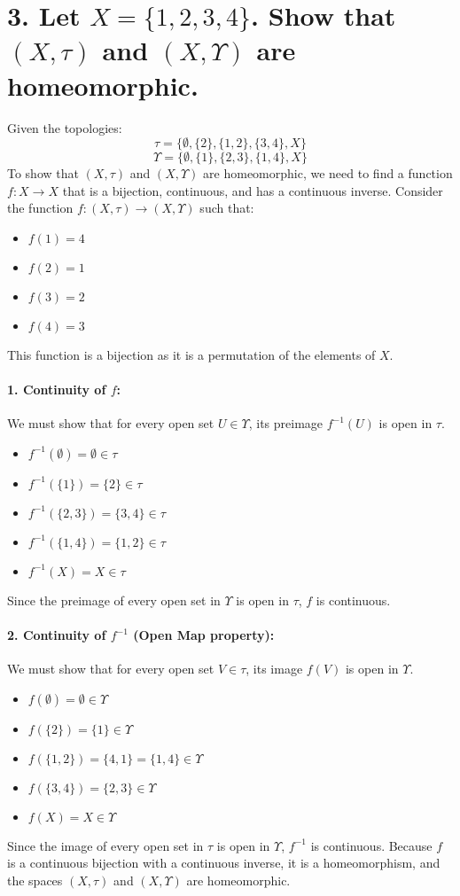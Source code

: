 \documentclass{article}
\begin{document}
\hrulefill

\section*{3. Let $X=\{1,2,3,4\}$. Show that $(X, \tau)$ and $(X,\Upsilon)$ are homeomorphic.}

Given the topologies:
$$ \tau=\{\emptyset,\{2\},\{1,2\},\{3,4\},X\} $$
$$ \Upsilon=\{\emptyset,\{1\},\{2,3\},\{1,4\}, X\} $$
To show that $(X, \tau)$ and $(X, \Upsilon)$ are homeomorphic, we need to find a function $f: X \to X$ that is a bijection, continuous, and has a continuous inverse.
Consider the function $f: (X, \tau) \to (X, \Upsilon)$ such that:
\begin{itemize}
    \item $f(1) = 4$
    \item $f(2) = 1$
    \item $f(3) = 2$
    \item $f(4) = 3$
\end{itemize}
This function is a bijection as it is a permutation of the elements of $X$.

\paragraph{1. Continuity of $f$:} We must show that for every open set $U \in \Upsilon$, its preimage $f^{-1}(U)$ is open in $\tau$.
\begin{itemize}
    \item $f^{-1}(\emptyset) = \emptyset \in \tau$
    \item $f^{-1}(\{1\}) = \{2\} \in \tau$
    \item $f^{-1}(\{2,3\}) = \{3,4\} \in \tau$
    \item $f^{-1}(\{1,4\}) = \{1,2\} \in \tau$
    \item $f^{-1}(X) = X \in \tau$
\end{itemize}
Since the preimage of every open set in $\Upsilon$ is open in $\tau$, $f$ is continuous.

\paragraph{2. Continuity of $f^{-1}$ (Open Map property):} We must show that for every open set $V \in \tau$, its image $f(V)$ is open in $\Upsilon$.
\begin{itemize}
    \item $f(\emptyset) = \emptyset \in \Upsilon$
    \item $f(\{2\}) = \{1\} \in \Upsilon$
    \item $f(\{1,2\}) = \{4,1\} = \{1,4\} \in \Upsilon$
    \item $f(\{3,4\}) = \{2,3\} \in \Upsilon$
    \item $f(X) = X \in \Upsilon$
\end{itemize}
Since the image of every open set in $\tau$ is open in $\Upsilon$, $f^{-1}$ is continuous.
Because $f$ is a continuous bijection with a continuous inverse, it is a homeomorphism, and the spaces $(X, \tau)$ and $(X, \Upsilon)$ are homeomorphic.
\end{document}
